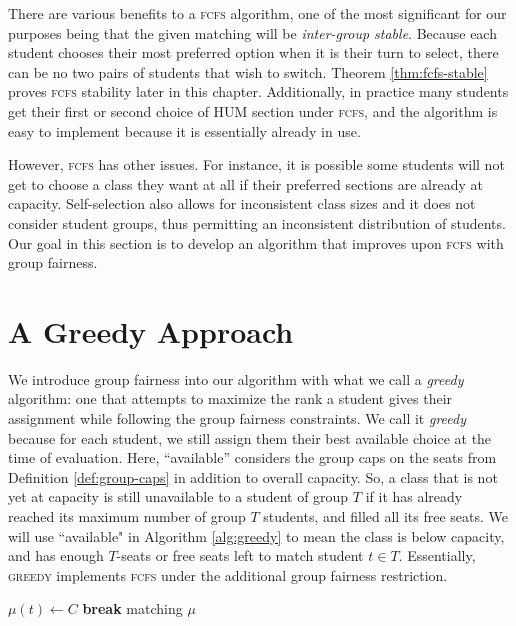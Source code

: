 There are various benefits to a \textsc{fcfs} algorithm, one of the most
significant for our purposes being that the given matching will be
\textit{inter-group stable}. Because each student chooses their most preferred
option when it is their turn to select, there can be no two pairs of students
that wish to switch. Theorem \ref{thm:fcfs-stable} proves \textsc{fcfs}
stability later in this chapter. Additionally, in practice many students get
their first or second choice of HUM section under \textsc{fcfs}, and the
algorithm is easy to implement because it is essentially already in use.

However, \textsc{fcfs} has other issues. For instance, it is possible some
students will not get to choose a class they want at all if their preferred
sections are already at capacity. Self-selection also allows for inconsistent class sizes
and it does not consider student groups, thus permitting an inconsistent
distribution of students. Our goal in this section is to develop an algorithm
that improves upon \textsc{fcfs} with group fairness.

\section{A Greedy Approach}

We introduce group fairness into our algorithm with what we call a
\textit{greedy} algorithm: one that attempts to maximize the rank a student
gives their assignment while following the group fairness constraints. We call it \textit{greedy}
because for each student, we still assign them their best available choice at
the time of evaluation.  Here, ``available” considers the group caps on the seats from Definition
\ref{def:group-caps} in addition to overall capacity. So, a class that is not yet at
capacity is still unavailable to a student of group $T$ if it has already
reached its maximum number of group $T$ students, and filled all its free seats.
We will use ``available" in Algorithm \ref{alg:greedy} to mean the class is below
capacity, and has enough $T$-seats or free seats left to match student $t \in T$.
Essentially, \textsc{greedy} implements \textsc{fcfs} under the additional group
fairness restriction.

\begin{algorithm}
  \caption{Greedy}
  \label{alg:greedy}
  \begin{algorithmic}[1]   
     \State $\mu(t) \gets C$
        \State \textbf{break}   \EndIf \EndFor
        \EndFor
    \State \Return matching $\mu$
  \end{algorithmic}
\end{algorithm}

